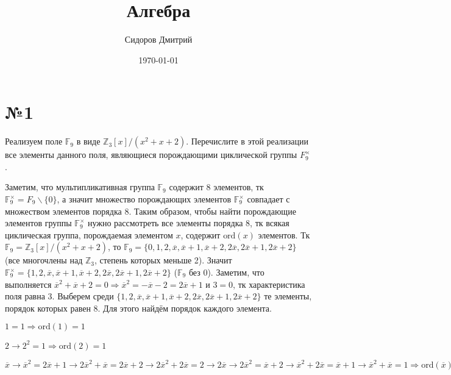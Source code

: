 \documentclass[a4paper, 16pt]{article}
\title{Алгебра}
\date{\today}
\author{Сидоров Дмитрий}
\affil{Группа БПМИ 219}
\newcommand{\Z} {\mathbb{Z}}
\newenvironment{solution}[1][Решение]{%
	\begin{trivlist}
		\item[\hskip \labelsep {\bfseries #1:}]
		\item \hspace{15pt}
	}{
	\end{trivlist}
}
\begin{document}
	\maketitle
	
	\section*{№1}
	
		Реализуем поле $\mathbb{F}_9$ в виде $\Z_3[x]/(x^2 + x + 2)$. Перечислите в этой реализации все элементы данного поля, являющиеся порождающими циклической группы $F^{\times}_9$ .
		
		\begin{solution}
			Заметим, что мультипликативная группа $\mathbb{F}_9$ содержит 8 элементов, тк  $\mathbb{F}_9^{\times} = F_9 \backslash \{0\}$, а значит множество порождающих элементов $\mathbb{F}_9^{\times} $
			совпадает с множеством элементов порядка 8. Таким образом, чтобы найти порождающие элементов группы
			$\mathbb{F}_9^{\times}$ нужно рассмотреть все элементы порядка 8, тк всякая циклическая группа, порождаемая элементом $x$, содержит $\text{ord}(x)$ элементов. Тк $\mathbb{F}_9 = \Z_3[x]/(x^2 + x + 2)$, то 
			$\mathbb{F}_9 = \{0, 1, 2, \overline{x},  \overline{x} + 1, 
			 \overline{x} + 2, 2 \overline{x}, 2 \overline{x} + 1, 2 \overline{x}+2\}$
			 (все многочлены над $\Z_3$, степень которых меньше 2).
			 Значит $\mathbb{F}_9^{\times} = \{1, 2, \overline{x},  \overline{x} + 1, 
			 \overline{x} + 2, 2 \overline{x}, 2 \overline{x} + 1, 2 \overline{x}+2\}$
			 ($\mathbb{F}_9$ без 0). Заметим, что выполняется $\overline{x}^2 + \overline{x} + 2 = 0 \Rightarrow \overline{x}^2 = -\overline{x} - 2 = 2\overline{x} + 1$ и $3 = 0$, тк характеристика поля равна 3. Выберем среди $\{1, 2, \overline{x},  \overline{x} + 1, 
			 \overline{x} + 2, 2 \overline{x}, 2 \overline{x} + 1, 2 \overline{x}+2\}$ те элементы, порядок которых равен 8. Для этого найдём порядок каждого элемента.
			 
			 $1 = 1 \Rightarrow \text{ord}(1) = 1$
			 
			 $2 \to 2^2 = 1 \Rightarrow \text{ord}(2) = 1$
			 
			 $\overline{x} \to \overline{x}^2 = 2\overline{x} + 1 \to
			 2\overline{x}^2 + \overline{x} = 2\overline{x} + 2 \to 2\overline{x}^2 + 2\overline{x} = 2 \to 2\overline{x} \to 2\overline{x}^2 = \overline{x} + 2 \to \overline{x}^2 + 2\overline{x} = \overline{x} + 1 \to \overline{x}^2 + \overline{x} = 1
			  \Rightarrow \text{ord}(\overline{x}) = 8$
			 

\end{solution}
\end{document}
